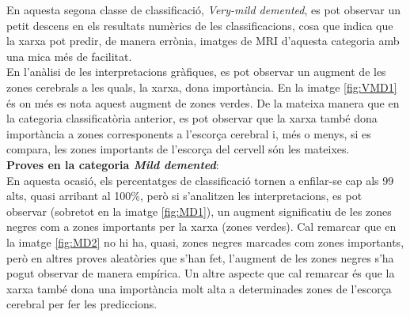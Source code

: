 \documentclass[a4paper,12pt]{report}
\begin{document}
En aquesta segona classe de classificació, \textit{Very-mild demented}, es pot observar un petit descens en els resultats numèrics de les classificacions, cosa que indica que la xarxa pot predir, de manera errònia, imatges de MRI d'aquesta categoria amb una mica més de facilitat.\\
En l'anàlisi de les interpretacions gràfiques, es pot observar un augment de les zones cerebrals a les quals, la xarxa, dona importància. En la imatge \ref{fig:VMD1} és on més es nota aquest augment de zones verdes. De la mateixa manera que en la categoria classificatòria anterior, es pot observar que la xarxa també dona importància a zones corresponents a l'escorça cerebral i, més o menys, si es compara, les zones importants de l'escorça del cervell són les mateixes.\\
\newpage
\textbf{Proves en la categoria \textit{Mild demented}}:\\
En aquesta ocasió, els percentatges de classificació tornen a enfilar-se cap als 99 alts, quasi arribant al 100\%, però si s'analitzen les interpretacions, es pot observar (sobretot en la imatge \ref{fig:MD1}), un augment significatiu de les zones negres com a zones importants per la xarxa (zones verdes). Cal remarcar que en la imatge \ref{fig:MD2} no hi ha, quasi, zones negres marcades com zones importants, però en altres proves aleatòries que s'han fet, l'augment de les zones negres s'ha pogut observar de manera empírica. Un altre aspecte que cal remarcar és que la xarxa també dona una importància molt alta a determinades zones de l'escorça cerebral per fer les prediccions.
\end{document}
